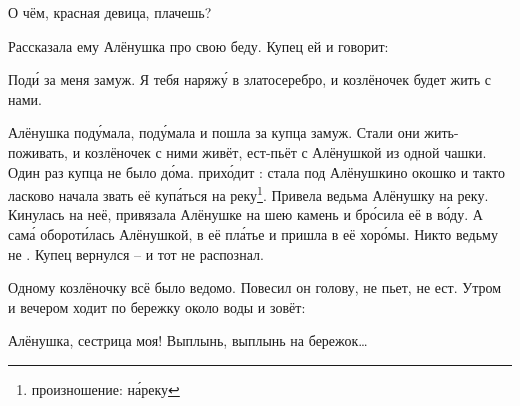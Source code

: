%
\begin{dialogue}
    \item О чём, красная девица, плачешь?
\end{dialogue}
Рассказала ему Алёнушка про свою беду. Купец ей и говорит:
\begin{dialogue}
    \item Под\'{и} за меня замуж. Я тебя наряж\'{у} в златосеребро, и козлёночек будет жить с нами.
\end{dialogue}
Алёнушка под\'{у}мала, под\'{у}мала и пошла за купца замуж. Стали они жить-поживать, и козлёночек с ними живёт, ест-пьёт с Алёнушкой из одной чашки. Один раз купца не было д\'{о}ма.  прих\'{о}дит : стала под Алёнушкино окошко и такто ласково начала звать её куп\'{а}ться на реку\footnote{произношение: н\'{а}реку}. Привела ведьма Алёнушку на реку. Кинулась на неё, привязала Алёнушке на шею камень и бр\'{о}сила её в в\'{о}ду. А сам\'{а} оборот\'{и}лась Алёнушкой,  в её пл\'{а}тье и пришла в её хор\'{о}мы. Никто ведьму не . Купец вернулся -- и тот не распознал.

Одному козлёночку всё было ведомо. Повесил он голову, не пьет, не ест. Утром и вечером ходит по бережку около воды и зовёт:
\begin{dialogue}
    \item Алёнушка, сестрица моя! Выплынь, выплынь на бережок\dots
\end{dialogue}

